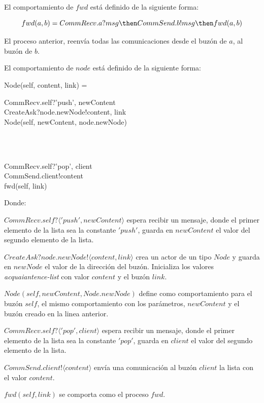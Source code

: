El comportamiento de $fwd$ está definido de la siguiente forma:

\[
  fwd(a, b) = CommRecv.a?msg \then CommSend.b!msg \then fwd(a, b)
\]

El proceso anterior, reenvía todas las comunicaciones desde el buzón de $a$, al buzón de $b$.

El comportamiento de $node$ está definido de la siguiente forma:

\begin{process}
Node(self, content, link) = {} \\ \quad
\begin{block}
CommRecv.self?\langle 'push', newContent \rangle \then \\
CreateAsk?node.newNode!\langle content, link \rangle \then \\
Node(self, newContent, node.newNode)
\end{block} \\
\Extchoice \\ \quad
\begin{block}
CommRecv.self?\langle 'pop', client \rangle \then  \\
CommSend.client!\langle content \rangle \then  \\
fwd(self, link)
\end{block}

\end{process}

Donde:

\begin{description}
 \item $CommRecv.self?\langle 'push', newContent \rangle$ espera recibir un mensaje, donde el primer elemento de la lista sea la constante $'push'$, guarda en $newContent$ el valor del segundo elemento de la lista.
 \item $CreateAsk?node.newNode!\langle content, link \rangle$ crea un actor de un tipo $Node$ y guarda en $newNode$ el valor de la dirección del buzón. Inicializa los valores \textit{acquaiantence-list} con valor $content$ y el buzón $link$.
 \item $Node(self, newContent, Node.newNode)$ define como comportamiento para el buzón $self$, el mismo comportamiento con los parámetros, $newContent$ y el buzón creado en la linea anterior.
 \item $CommRecv.self?\langle 'pop', client \rangle$ espera recibir un mensaje, donde el primer elemento de la lista sea la constante $'pop'$, guarda en $client$ el valor del segundo elemento de la lista.
 \item $CommSend.client!\langle content \rangle$ envía una comunicación al buzón $client$ la lista con el valor $content$.
 \item $fwd(self, link)$ se comporta como el proceso $fwd$.
\end{description}

